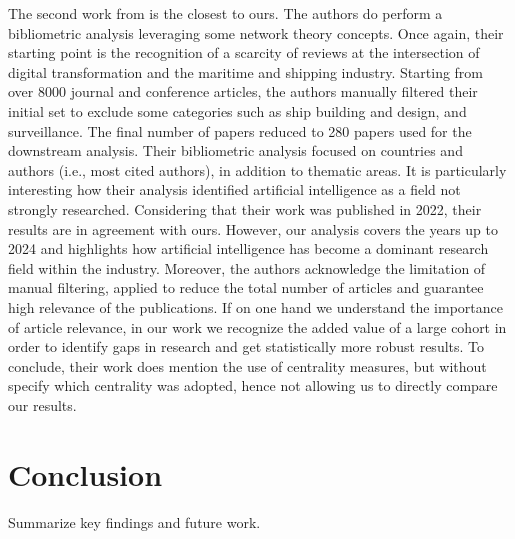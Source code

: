 \documentclass[a4paper, review, endfloat, authoryear]{elsarticle}
\begin{document}
	The second work from \citep{jovic2022digitalization} is the closest to ours. The authors do perform a bibliometric analysis leveraging some network theory concepts. Once again, their starting point is the recognition of a scarcity of reviews at the intersection of digital transformation and the maritime and shipping industry. Starting from over 8000 journal and conference articles, the authors manually filtered their initial set to exclude some categories such as ship building and design, and surveillance. The final number of papers reduced to 280 papers used for the downstream analysis. Their bibliometric analysis focused on countries and authors (i.e., most cited authors), in addition to thematic areas. It is particularly interesting how their analysis identified artificial intelligence as a field not strongly researched. Considering that their work was published in 2022, their results are in agreement with ours. However, our analysis covers the years up to 2024 and highlights how artificial intelligence has become a dominant research field within the industry. Moreover, the authors acknowledge the limitation of manual filtering, applied to reduce the total number of articles and guarantee high relevance of the publications. If on one hand we understand the importance of article relevance, in our work we recognize the added value of a large cohort in order to identify gaps in research and get statistically more robust results. To conclude, their work does mention the use of centrality measures, but without specify which centrality was adopted, hence not allowing us to directly compare our results.
	 
	 
	
	\section{Conclusion}
	Summarize key findings and future work.
	
	
	
	
\end{document}
